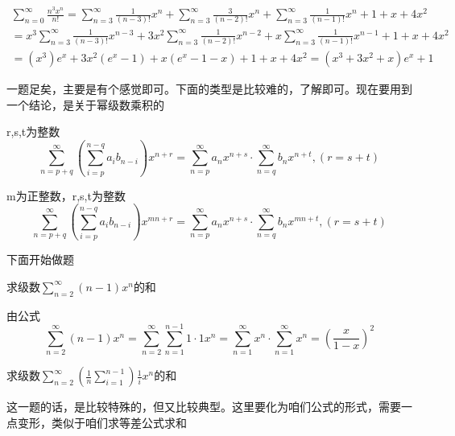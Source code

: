 \documentclass[lang=cn,10pt]{elegantbook}
\begin{document}
		\begin{equation*}
			\begin{split}
				\sum_{n=0}^{\infty }\frac{n^{3}x^{n}}{n!}=\sum_{n=3}^{\infty }\frac{1}{(n-3)!}x^{n}+\sum_{n=3}^{\infty }\frac{3}{(n-2)!}x^{n}+\sum_{n=3}^{\infty }\frac{1}{(n-1)!}x^{n}+1+x+4x^{2}\\
				=x^{3}\sum_{n=3}^{\infty }\frac{1}{(n-3)!}x^{n-3}+3x^{2}\sum_{n=3}^{\infty }\frac{1}{(n-2)!}x^{n-2}+x\sum_{n=3}^{\infty }\frac{1}{(n-1)!}x^{n-1}+1+x+4x^{2}\\
				=(x^{3})e^{x}+3x^{2}(e^{x}-1)+x(e^{x}-1-x)+1+x+4x^{2}=(x^{3}+3x^{2}+x)e^{x}+1
			\end{split}		
		\end{equation*}
		
		一题足矣，主要是有个感觉即可。下面的类型是比较难的，了解即可。现在要用到一个结论，是关于幂级数乘积的
		
		\begin{conclusion}
			r,s,t为整数
			\begin{equation*}
				\sum_{n=p+q}^{\infty }(\sum_{i=p}^{n-q}a_{i} b_{n-i}  ) x^{n+r} =\sum_{n=p}^{\infty }a_{n}x^{n+s}\cdot  \sum_{n=q}^{\infty }b_{n}x^{n+t},(r=s+t )
			\end{equation*}
			
			m为正整数，r,s,t为整数
			\begin{equation*}
				\sum_{n=p+q}^{\infty }(\sum_{i=p}^{n-q}a_{i} b_{n-i}  ) x^{mn+r} =\sum_{n=p}^{\infty }a_{n}x^{n+s}\cdot  \sum_{n=q}^{\infty }b_{n}x^{mn+t},(r=s+t )
			\end{equation*}
		\end{conclusion}
		
		下面开始做题
		
		\begin{example}
			求级数$\sum_{n=2}^{\infty }(n-1)x^{n} $的和
		\end{example}
		
		由公式
		\begin{equation*}
			\sum_{n=2}^{\infty }(n-1)x^{n}=\sum_{n=2}^{\infty }
			\sum_{n=1}^{n-1 }1\cdot 1x^{n}=\sum_{n=1}^{\infty }x^{n}
			\cdot \sum_{n=1}^{\infty }x^{n}=(\frac{x}{1-x})^{2}
		\end{equation*}
		
		\begin{example}
			求级数$\sum_{n=2}^{\infty }(\frac{1}{n}\sum_{i=1}^{n-1})\frac{1}{i}x^{n} $的和
		\end{example}
		
		这一题的话，是比较特殊的，但又比较典型。这里要化为咱们公式的形式，需要一点变形，类似于咱们求等差公式求和
		
\end{document}
